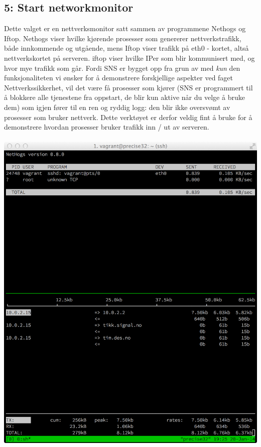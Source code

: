 \documentclass{article}
\begin{document}
\subsection{5: Start networkmonitor}
Dette valget er en nettverksmonitor satt sammen av programmene Nethogs og Iftop. Nethogs viser hvilke kjørende prosesser som genererer nettverkstrafikk, både innkommende og utgående, mens Iftop viser trafikk på eth0 - kortet, altså nettverkskortet på serveren. iftop viser hvilke IPer som blir kommunisert med, og hvor mye trafikk som går. Fordi SNS er bygget opp fra grun av med \textit{kun} den funksjonaliteten vi ønsker for å demonstrere forskjellige aspekter ved faget Nettverkssikkerhet, vil det være få prosesser som kjører (SNS er programmert til å blokkere alle tjenestene fra oppstart, de blir kun aktive når du velge å bruke dem) som igjen fører til en ren og ryddig logg: den blir ikke oversvømt av prosesser som bruker nettverk. Dette verktøyet er derfor veldig fint å bruke for å demonstrere hvordan prosesser bruker trafikk inn / ut av serveren. 
\\ \\
\includegraphics[scale = 0.6]{networkmonitor.png} 
\end{document}
